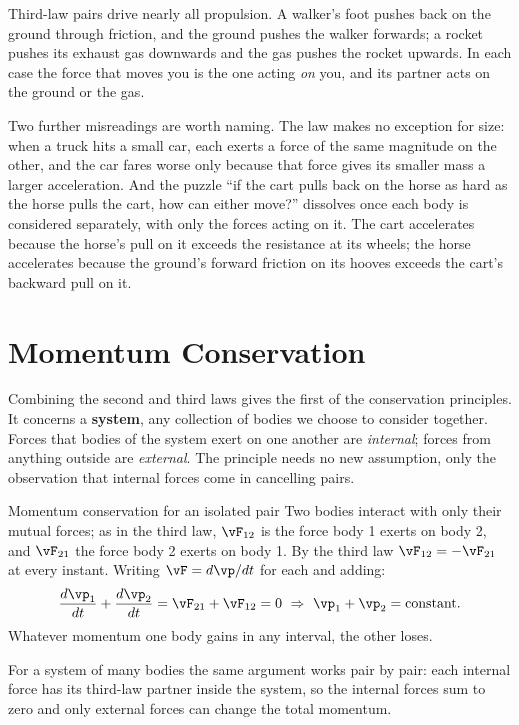 Third-law pairs drive nearly all propulsion. A walker's foot pushes back on the ground through
friction, and the ground pushes the walker forwards; a rocket pushes its exhaust gas downwards and the
gas pushes the rocket upwards. In each case the force that moves you is the one acting \emph{on} you,
and its partner acts on the ground or the gas.

Two further misreadings are worth naming. The law makes no exception for size: when a truck hits a
small car, each exerts a force of the same magnitude on the other, and the car fares worse only because
that force gives its smaller mass a larger acceleration. And the puzzle ``if the cart pulls back on the
horse as hard as the horse pulls the cart, how can either move?'' dissolves once each body is considered
separately, with only the forces acting on it. The cart accelerates because the horse's pull on it exceeds
the resistance at its wheels; the horse accelerates because the ground's forward friction on its hooves
exceeds the cart's backward pull on it.

\section{Momentum Conservation}

Combining the second and third laws gives the first of the conservation principles. It concerns a
\textbf{system}, any collection of bodies we choose to consider together. Forces that bodies of the
system exert on one another are \emph{internal}; forces from anything outside are \emph{external}. The
principle needs no new assumption, only the observation that internal forces come in cancelling pairs.

\begin{derivbox}{Momentum conservation for an isolated pair}
Two bodies interact with only their mutual forces; as in the third law, $\vF_{12}$ is the force body 1
exerts on body 2, and $\vF_{21}$ the force body 2 exerts on body 1. By the third law
$\vF_{12}=-\vF_{21}$ at every instant. Writing $\vF=d\vp/dt$ for each and adding:
\[
\frac{d\vp_1}{dt}+\frac{d\vp_2}{dt}=\vF_{21}+\vF_{12}=0\ \Rightarrow\ \vp_1+\vp_2=\text{constant}.
\]
Whatever momentum one body gains in any interval, the other loses.
\end{derivbox}

For a system of many bodies the same argument works pair by pair: each internal force has its
third-law partner inside the system, so the internal forces sum to zero and only external forces can
change the total momentum.

